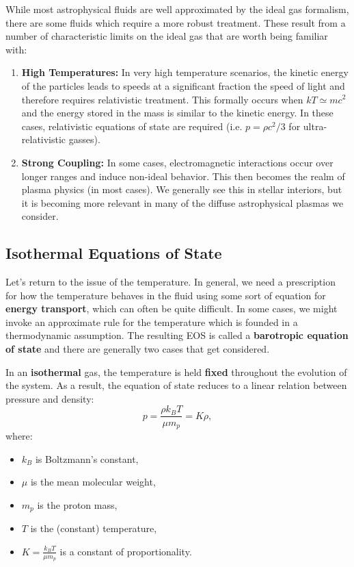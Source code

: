 \begin{remark}
    While most astrophysical fluids are well approximated by the ideal gas formalism, there are some fluids which require a more robust treatment. These result from a number of characteristic limits on the ideal gas that are worth being familiar with:
\begin{enumerate}
    \item \textbf{High Temperatures:} In very high temperature scenarios, the kinetic energy of the particles leads to speeds at a significant fraction the speed of light and therefore requires relativistic treatment. This formally occurs when $kT \simeq mc^2$ and the energy stored in the mass is similar to the kinetic energy. In these cases, relativistic equations of state are required (i.e. $p = \rho c^2/3$ for ultra-relativistic gasses).
    \item \textbf{Strong Coupling:} In some cases, electromagnetic interactions occur over longer ranges and induce non-ideal behavior. This then becomes the realm of plasma physics (in most cases). We generally see this in stellar interiors, but it is becoming more relevant in many of the diffuse astrophysical plasmas we consider.
\end{enumerate}
\end{remark}

\subsection{Isothermal Equations of State}

Let's return to the issue of the temperature. In general, we need a prescription for how the temperature behaves in the fluid using some sort of equation for \textbf{energy transport}, which can often be quite difficult. In some cases, we might invoke an approximate rule for the temperature which is founded in a thermodynamic assumption. The resulting EOS is called a \textbf{barotropic equation of state} and there are generally two cases that get considered.

In an \textbf{isothermal} gas, the temperature is held \textbf{fixed} throughout the evolution of the system. As a result, the equation of state reduces to a linear relation between pressure and density:
\[
p = \frac{\rho k_B T}{\mu m_p} = K \rho,
\]
where:
\begin{itemize}
    \item \( k_B \) is Boltzmann's constant,
    \item \( \mu \) is the mean molecular weight,
    \item \( m_p \) is the proton mass,
    \item \( T \) is the (constant) temperature,
    \item \( K = \frac{k_B T}{\mu m_p} \) is a constant of proportionality.
\end{itemize}

